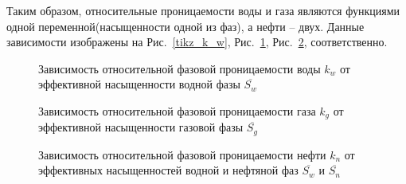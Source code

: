 Таким образом, относительные проницаемости воды и газа являются функциями одной 
переменной(насыщенности одной из фаз), а нефти -- двух. Данные зависимости
изображены на Рис.~\ref{tikz_k_w}, Рис.~\ref{tikz_k_g}, Рис.~\ref{tikz_k_n},
соответственно.

\begin{figure}[h]
\begin{minipage}[h]{0.49\linewidth}
\caption{Зависимость относительной фазовой проницаемости воды $k_w$
  от эффективной насыщенности водной фазы $\overline{S_w}$}
\label{tikz_k_w}
\end{minipage}
\hfill
\begin{minipage}[h]{0.49\linewidth}
\caption{Зависимость относительной фазовой проницаемости газа $k_g$ 
  от эффективной насыщенности газовой фазы $\overline{S_g}$}
\label{tikz_k_g}
\end{minipage}
\end{figure}

\begin{figure}[h]
\begin{center}
\caption{Зависимость относительной фазовой проницаемости нефти $k_n$ 
  от эффективных насыщенностей водной и нефтяной фаз $\overline{S_w}$ и $\overline{S_n}$}
\label{tikz_k_n}
\end{center}
\end{figure}

